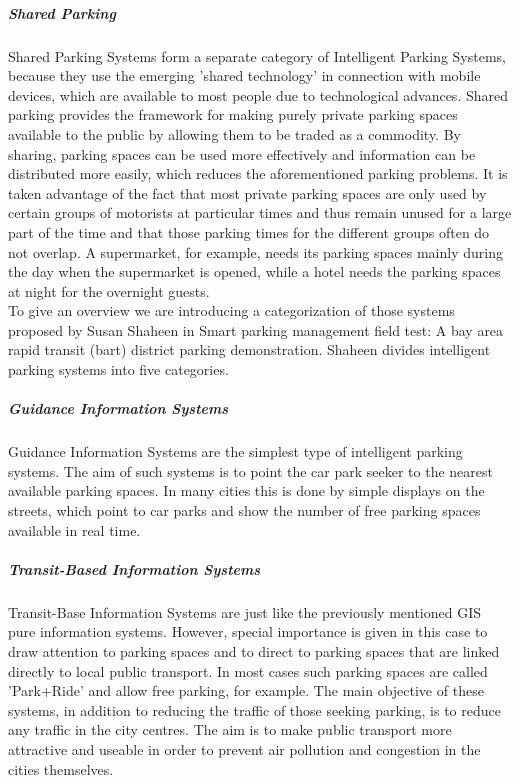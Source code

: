 \documentclass[
a4paper,     %
titlepage,   %
14pt         %
]{scrartcl}  %
\theoremstyle{mystyle}
\begin{document}
\subparagraph{Shared Parking}
Shared Parking Systems form a separate category of Intelligent Parking Systems, because they use the emerging 'shared technology' in connection with mobile devices, which are available to most people due to technological advances. Shared parking provides the framework for making purely private parking spaces available to the public by allowing them to be traded as a commodity. \cite{itdp2014shared} By sharing, parking spaces can be used more effectively and information can be distributed more easily, which reduces the aforementioned parking problems. It is taken advantage of the fact that most private parking spaces are only used by certain groups of motorists at particular times and thus remain unused for a large part of the time and that those parking times for the different groups often do not overlap.\cite{vtpi2015shared} A supermarket, for example, needs its parking spaces mainly during the day when the supermarket is opened, while a hotel needs the parking spaces at night for the overnight guests.\\

To give an overview we are introducing a categorization of those systems proposed by Susan Shaheen in Smart parking management field test: A bay area rapid transit (bart) district parking demonstration.\cite{shaheen2005smart} Shaheen divides intelligent parking systems into five categories.

\subparagraph{Guidance Information Systems}
Guidance Information Systems are the simplest type of intelligent parking systems. The aim of such systems is to point the car park seeker to the nearest available parking spaces. In many cities this is done by simple displays on the streets, which point to car parks and show the number of free parking spaces available in real time.

\subparagraph{Transit-Based Information Systems}
Transit-Base Information Systems are just like the previously mentioned GIS pure information systems. However, special importance is given in this case to draw attention to parking spaces and to direct to parking spaces that are linked directly to local public transport. In most cases such parking spaces are called 'Park+Ride' and allow free parking, for example. The main objective of these systems, in addition to reducing the traffic of those seeking parking, is to reduce any traffic in the city centres. The aim is to make public transport more attractive and useable in order to prevent air pollution and congestion in the cities themselves. 
\end{document}
